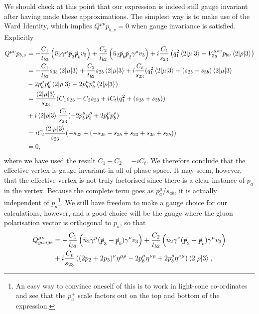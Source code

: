 We should check at this point that our expression is indeed still gauge invariant after having made these approximations. The simplest way is to make use of the Ward Identity, which implies $Q^{\mu \nu} p_{b, \nu} = 0$ when gauge invariance is satisfied. Explicitly 
\begin{equation}
\begin{split}
Q^{\mu \nu}p_{b, \nu} &= -\frac{C_1}{t_{b3}} \left(\bar{u}_2 \gamma^\mu \slashed{p}_3 \slashed{p}_b v_3 \right) + \frac{C_2}{t_{b2}} \left( \bar{u}_2 \slashed{p}_b \slashed{p}_2 \gamma^\mu v_3 \right) + i  \frac{C_t}{s_{23}} \left(q_1^2  \mathinner{\langle2\vert\mu\vert3\rangle}_{} + V^{\mu \rho \nu}_{3g}p_{b \nu}  \mathinner{\langle2\vert\rho\vert3\rangle}_{} \right) \\
&= -\frac{C_1}{t_{b3}} s_{3b} \mathinner{\langle2\vert\mu\vert3\rangle}_{} + \frac{C_2}{t_{b2}} s_{2b} \mathinner{\langle2\vert\mu\vert3\rangle}_{} + i \frac{C_t}{s_{23}}(q_1^2 \mathinner{\langle2\vert\mu\vert3\rangle}_{} + (s_{2b} + s_{3b})\mathinner{\langle2\vert\mu\vert3\rangle}_{}\\
&-2p_b^\mu p_b^\rho\mathinner{\langle2\vert\rho\vert3\rangle}_{} + 2p_b^\mu p_b^\rho \mathinner{\langle2\vert\rho\vert3\rangle}_{}) \\
&= \frac{\mathinner{\langle2\vert\mu\vert3\rangle}_{}}{s_{23}}(C_1 s_{23} - C_2 s_{23} + i C_t(q_1^2 + (s_{2b} + s_{3b})) \\
&+ i\mathinner{\langle2\vert\rho\vert3\rangle}_{} \frac{C_t}{s_{23}}(-2p_b^\mu p_b^\rho + 2p_b^\mu p_b^\rho) \\
&= i C_t \frac{\mathinner{\langle2\vert\mu\vert3\rangle}_{}}{s_{23}}(-s_{23} + (-s_{2b} - s_{3b} + s_{23} + s_{2b} + s_{3b})) \\
&= 0,
\end{split}
\end{equation}
where we have used the result $C_1 - C_2 = -iC_t$. We therefore conclude that the effective vertex is gauge invariant in all of phase space. It may seem, however, that the effective vertex is not truly factorised since there is a clear instance of $p_a$ in the vertex. Because the complete term goes as $p_a^\mu/s_{ab}$, it is actually independent of $p_a$\footnote{An easy way to convince oneself of this is to work in light-cone co-ordinates and see that the $p_a^+$ scale factors out on the top and bottom of the expression.}. We still have freedom to make a gauge choice for our calculations, however, and a good choice will be the gauge where the gluon polarisation vector is orthogonal to $p_a$, so that %
\begin{equation}
\begin{split}
Q^{\mu \nu}_{gauge} &= -\frac{C_1}{t_{b3}} \left(\bar{u}_2 \gamma^\mu (\slashed{p}_3-\slashed{p}_b)\gamma^\nu v_3 \right) + \frac{C_2}{t_{b2}} \left( \bar{u}_2 \gamma^\nu (\slashed{p}_2-\slashed{p}_b) \gamma^\mu v_3 \right)  \\
&+ i  \frac{C_t}{s_{23}} \left((2p_2+2p_3)^\nu \eta^{\mu \rho} - 2p_b^\mu \eta^{\nu \rho} + 2p_b^\rho \eta^{\nu \mu} \right) \mathinner{\langle2\vert\rho\vert3\rangle}_{},
\end{split}
\end{equation}
